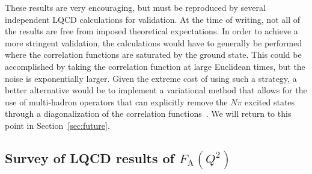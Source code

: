 \documentclass{ar-1col}
\def\asm#1{{\color{blue}#1}}
\def\del#1{}
\begin{document}
\del{\textcolor{gray}{ While these results are very encouraging, they are not conclusive in the sense that they require us to impose our theoretical prior on the analysis, rather than the results naturally ``falling out'' from the numerical analysis.
}}
\asm{These results are very encouraging,
 but must be reproduced by several independent LQCD calculations for validation.
At the time of writing,
 not all of the results are free from imposed theoretical expectations.}
In order to achieve \del{this}\asm{a} more stringent validation, the calculations would have to generally be performed \del{at larger source-sink separation times }where the correlation functions are \del{all }saturated by the ground state\asm{.
This could be accomplished by taking the correlation function at large Euclidean times},
 but the noise is exponentially larger.
Given the extreme cost of \asm{using }such a strategy, a better \del{solution }\asm{alternative }would be to implement a variational method that allows for the use of multi-hadron operators that can explicitly remove the $N\pi$ excited states through a diagonalization of the correlation functions~\cite{Blossier:2009kd}.  We will return to this point in Section~\ref{sec:future}.


\subsection{Survey of LQCD results of $F_{\mathrm{A}}(Q^2)$\label{sec:lqcd_results}}
\end{document}
